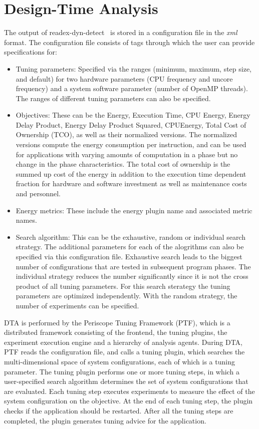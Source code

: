 \section{Design-Time Analysis} \label{sec:dta}
The output of readex-dyn-detect~\cite{kumaraswamy2018design} is stored in a configuration file in the \textit{xml} format. The configuration file consists of tags through which the user can provide specifications for:
\begin{itemize}
	\item Tuning parameters: Specified via the ranges (minimum, maximum, step size, and default) for two hardware parameters (CPU frequency and uncore frequency) and a system software parameter (number of OpenMP threads). The ranges of different tuning parameters can also be specified.
	\item Objectives: These can be the Energy, Execution Time, CPU Energy, Energy Delay Product, Energy Delay Product Squared, CPUEnergy, Total Cost of Ownership (TCO), as well as their normalized versions. The normalized versions compute the energy consumption per instruction, and can be used for applications with varying amounts of computation in a phase but no change in the phase characteristics. The total cost of ownership is the summed up cost of the energy in addition to the execution time dependent fraction for hardware and software investment as well as maintenance costs and personnel. 
	\item Energy metrics: These include the energy plugin name and associated metric names. 
	\item Search algorithm: This can be the exhaustive, random or individual search strategy. The additional parameters for each of the alogrithms can also be specified via this configuration file. Exhaustive search leads to the biggest number of configurations that are tested in subsequent program phases. The individual strategy reduces the number significantly since it is not the cross product of all tuning parameters. For this search sterategy the tuning parameters are optimized independently. With the random strategy, the number of experiments can be specified.
\end{itemize} 

DTA is performed by the Periscope Tuning Framework (PTF), which is a distributed framework consisting of the frontend, the tuning plugins, the experiment execution engine and a hierarchy of analysis agents. During DTA, PTF reads the configuration file, and calls a tuning plugin, which  searches the multi-dimensional space of system configurations, each of which is a tuning parameter. The tuning plugin performs one or more tuning steps, in which a user-specified search algorithm determines the set of system configurations that are evaluated. Each tuning step executes experiments to measure the effect of the system configuration on the objective. At the end of each tuning step, the plugin checks if the application should be restarted. After all the tuning steps are completed, the plugin generates tuning advice for the application.

